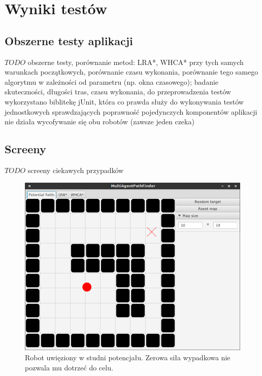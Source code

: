 \chapter{Wyniki testów}
\label{ch:tests}

\section{Obszerne testy aplikacji}
$TODO$ obszerne testy, porównanie metod: LRA*, WHCA* przy tych samych warunkach początkowych, porównanie czasu wykonania, porównanie tego samego algorytmu w zależności od parametru (np. okna czasowego); badanie skuteczności, długości tras, czasu wykonania, 
do przeprowadzenia testów wykorzystano biblitekę jUnit, która co prawda służy do wykonywania testów jednostkowych sprawdzających poprawność pojedynczych komponentów aplikacji
nie działa wycofywanie się obu robotów (zawsze jeden czeka)


\section{Screeny}
$TODO$ screeny ciekawych przypadków

\begin{figure}
	\centering
	\includegraphics[width=0.8\columnwidth]{img/robopath/field-potential-hole}
	\caption{Robot uwięziony w studni potencjału. Zerowa siła wypadkowa nie pozwala mu dotrzeć do celu.}
	\label{fig:app-tech-intellij}
\end{figure}

